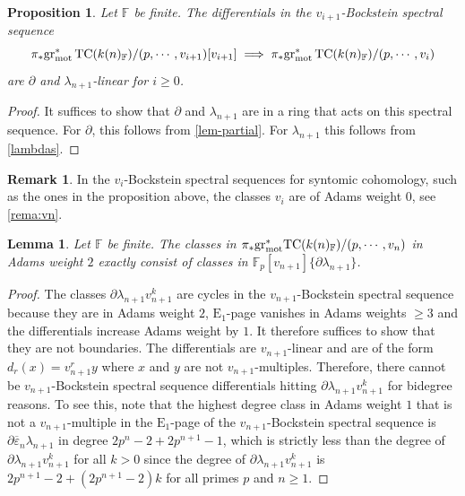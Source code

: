 \documentclass[english,10pt]{amsart}
\newcommand{\field}{\mathbb{F}}
\newtheorem{prop}{Proposition}[section]
\newtheorem{lemm}{Lemma}[section]
\theoremstyle{definition}
\newtheorem{rema}{Remark}[section]
\numberwithin{equation}{section}
\DeclareMathOperator{\TC}{TC}
\newcommand{\grmot}{\mathrm{gr}_{\textup{mot}}^*}
\begin{document}
\begin{prop}\label{lambda-linearity}
Let  $\field$ be finite. The differentials in the $v_{i+1}$-Bockstein spectral sequence 
\[ \pi_*\grmot\TC(k(n)_{\field})/(p,\cdots ,v_{i+1})[v_{i+1}]\implies \pi_*\grmot\TC(k(n)_{\field})/(p,\cdots ,v_{i})\]
are $\partial$ and $\lambda_{n+1}$-linear for $i\ge 0$. 
\end{prop}
\begin{proof}
It suffices to show that $\partial$ and $\lambda_{n+1}$ are in a ring that acts on this spectral sequence. For $\partial$, this follows from \autoref{lem-partial}. 
For $\lambda_{n+1}$ this follows from \autoref{lambdas}. 
\end{proof}



\begin{rema}
In the $v_i$-Bockstein spectral sequences for syntomic cohomology, such as the ones in the proposition above, the classes $v_i$ are of Adams weight $0$, see \autoref{rema:vn}. 
\end{rema}



\begin{lemm}\label{vn-bockstein}
Let $\field$ be finite. 
The classes in
$\pi_{*}\grmot \mathrm{TC}(k(n)_{\field})/(p,\cdots,v_n)$ in Adams weight $2$ exactly consist of classes in $\mathbb{F}_p[v_{n+1}]\{\partial \lambda_{n+1}\}$. 
\end{lemm}
\begin{proof}
The classes $\partial \lambda_{n+1}v_{n+1}^k$ are cycles in the $v_{n+1}$-Bockstein spectral sequence because they are in Adams weight $2$, $\mathrm{E}_1$-page vanishes in Adams weights $\ge 3$ and the differentials increase Adams weight by $1$. 
It therefore suffices to show that they are not boundaries. 
The differentials are $v_{n+1}$-linear and are of the form $d_r(x)=v_{n+1}^ry$ where $x$ and $y$ are not $v_{n+1}$-multiples. Therefore, there cannot be $v_{n+1}$-Bockstein spectral sequence differentials hitting $\partial \lambda_{n+1}v_{n+1}^k$ for bidegree reasons. To see this, note that the highest degree class in Adams weight $1$ that is not a $v_{n+1}$-multiple in the $\mathrm{E}_1$-page of the $v_{n+1}$-Bockstein spectral sequence is $\partial \overline{\varepsilon}_n\lambda_{n+1}$ in degree $2p^{n}-2+2p^{n+1}-1$, which is strictly less than the degree of $\partial \lambda_{n+1}v_{n+1}^k$ for all $k>0$ since the degree of $\partial \lambda_{n+1}v_{n+1}^k$ is $2p^{n+1}-2+(2p^{n+1}-2)k$ for all primes $p$ and $n\ge 1$.  
\end{proof}
\end{document}
